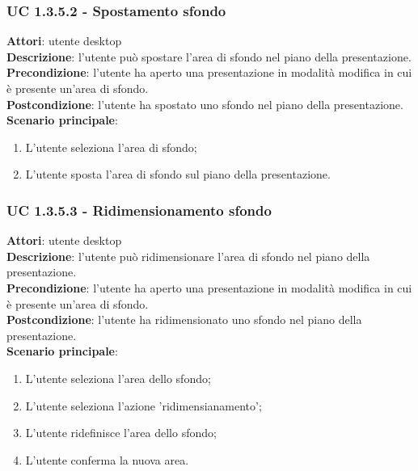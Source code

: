 \subsubsection{UC 1.3.5.2 - Spostamento sfondo}{
	\label{uc1.3.5.2}
	\textbf{Attori}: utente desktop \\
	\textbf{Descrizione}: l'utente può spostare l'area di sfondo nel piano della presentazione. \\
	\textbf{Precondizione}: l'utente ha aperto una presentazione in modalità modifica in cui è presente un'area di sfondo.	\\
	\textbf{Postcondizione}: l'utente ha spostato uno sfondo nel piano della presentazione.	\\
	\textbf{Scenario principale}:
	\begin{enumerate}
		\item L'utente seleziona l'area di sfondo;
		\item L'utente sposta l'area di sfondo sul piano della presentazione.
	\end{enumerate}
}
\subsubsection{UC 1.3.5.3 - Ridimensionamento sfondo}{
	\label{uc1.3.5.3}
	\textbf{Attori}: utente desktop \\
	\textbf{Descrizione}: l'utente può ridimensionare l'area di sfondo nel piano della presentazione. \\
	\textbf{Precondizione}: l'utente ha aperto una presentazione in modalità modifica in cui è presente un'area di sfondo.	\\
	\textbf{Postcondizione}: l'utente ha ridimensionato uno sfondo nel piano della presentazione.	\\
	\textbf{Scenario principale}:
	\begin{enumerate}
		\item L'utente seleziona l'area dello sfondo;
		\item L'utente seleziona l'azione 'ridimensianamento';
		\item L'utente ridefinisce l'area dello sfondo;
		\item L'utente conferma la nuova area.
	\end{enumerate}
}
